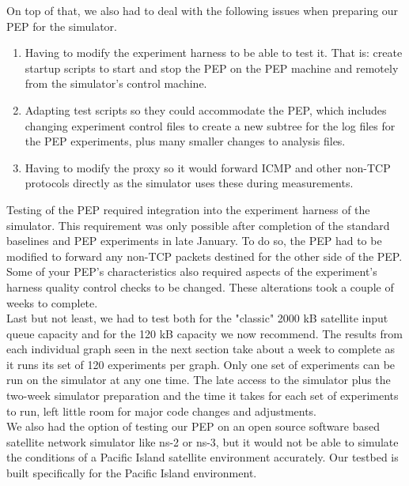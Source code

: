 \begin{appendices}
On top of that, we also had to deal with the following issues when preparing our PEP for the simulator.\\
\begin{enumerate}
\item Having to modify the experiment harness to be able to test it. That is: create startup scripts to start and stop the PEP on the PEP machine and remotely from the simulator's control machine. 
\item Adapting test scripts so they could accommodate the PEP, which includes changing experiment control files to create a new subtree for the log files for the PEP experiments, plus many smaller changes to analysis files.
\item Having to modify the proxy so it would forward ICMP and other non-TCP protocols directly as the simulator uses these during measurements. \\
\end{enumerate}

Testing of the PEP required integration into the experiment harness of the simulator. This requirement was only possible after completion of the standard baselines and PEP experiments in late January. To do so, the PEP had to be modified to forward any non-TCP packets destined for the other side of the PEP. Some of your PEP's characteristics also required aspects of the experiment's harness quality control checks to be changed. These alterations took a couple of weeks to complete. \\

Last but not least, we had to test both for the "classic" 2000 kB satellite input queue capacity and for the 120 kB capacity we now recommend. 
The results from each individual graph seen in the next section take about a week to complete as it runs its set of 120 experiments per graph. Only one set of experiments can be run on the simulator at any one time. The late access to the simulator plus the two-week simulator preparation and the time it takes for each set of experiments to run, left little room for major code changes and adjustments. \\

We also had the option of testing our PEP on an open source software based satellite network simulator like ns-2 or ns-3, but it would not be able to simulate the conditions of a Pacific Island satellite environment accurately. Our testbed is built specifically for the Pacific Island environment.\\


\end{appendices}
